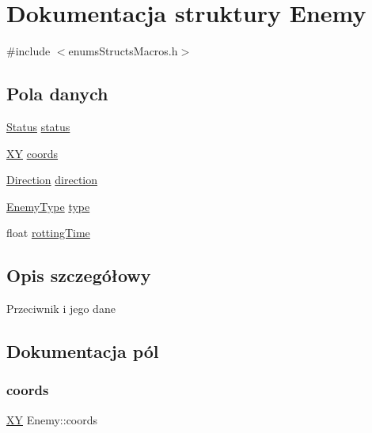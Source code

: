 \hypertarget{struct_enemy}{}\section{Dokumentacja struktury Enemy}
\label{struct_enemy}


{\ttfamily \#include $<$enums\+Structs\+Macros.\+h$>$}

\subsection*{Pola danych}
\begin{DoxyCompactItemize}
\item 
\mbox{\hyperlink{enums_structs_macros_8h_a67a0db04d321a74b7e7fcfd3f1a3f70b}{Status}} \mbox{\hyperlink{struct_enemy_af5feea31ac74cfff2cbbfdb149bcf58f}{status}}
\item 
\mbox{\hyperlink{struct_x_y}{XY}} \mbox{\hyperlink{struct_enemy_a29a8a996d7295d7a8389a9c491c01968}{coords}}
\item 
\mbox{\hyperlink{enums_structs_macros_8h_a224b9163917ac32fc95a60d8c1eec3aa}{Direction}} \mbox{\hyperlink{struct_enemy_a7c52f26b7de302092a7fea48496916a7}{direction}}
\item 
\mbox{\hyperlink{enums_structs_macros_8h_ac3e413a86119db4b031458c7259e268e}{Enemy\+Type}} \mbox{\hyperlink{struct_enemy_a51791619a70962355568fae00cb96cdb}{type}}
\item 
float \mbox{\hyperlink{struct_enemy_ae1fec0d15b3a33d372e918f691b9f3f7}{rotting\+Time}}
\end{DoxyCompactItemize}


\subsection{Opis szczegółowy}
Przeciwnik i jego dane 

\subsection{Dokumentacja pól}
\mbox{\label{struct_enemy_a29a8a996d7295d7a8389a9c491c01968}} 
\subsubsection{\texorpdfstring{coords}{coords}}
{\footnotesize\ttfamily \mbox{\hyperlink{struct_x_y}{XY}} Enemy\+::coords}

